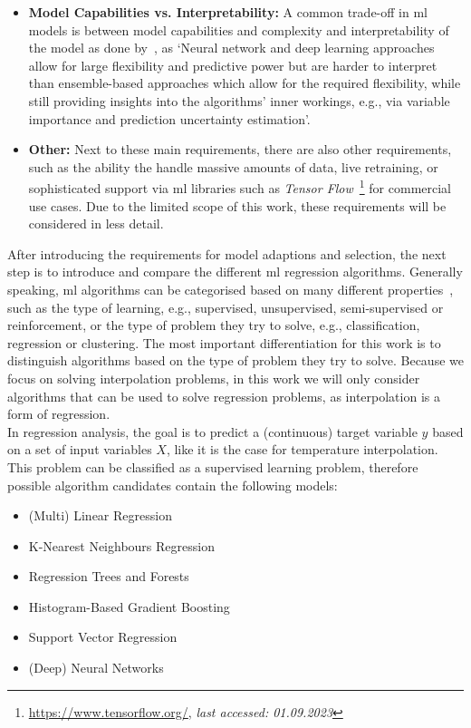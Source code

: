 \begin{itemize}
    \item \textbf{Model Capabilities vs. Interpretability:} A common trade-off in \gls{ml} models is between model capabilities and complexity and interpretability of the model as done by~\cite{zumwald2021mapping}, as `Neural network and deep learning approaches allow for large flexibility and predictive power but are harder to interpret than ensemble-based approaches which allow for the required flexibility, while still providing insights into the algorithms' inner workings, e.g., via variable importance and prediction uncertainty estimation'.
    \item \textbf{Other:} Next to these main requirements, there are also other requirements, such as the ability the handle massive amounts of data, live retraining, or sophisticated support via \gls{ml} libraries such as \textit{Tensor Flow}~\footnote{\url{https://www.tensorflow.org/}, \textit{last accessed: 01.09.2023}} for commercial use cases. Due to the limited scope of this work, these requirements will be considered in less detail.
\end{itemize}

After introducing the requirements for model adaptions and selection, the next step is to introduce and compare the different \gls{ml} regression algorithms.
Generally speaking, \gls{ml} algorithms can be categorised based on many different properties~\cite{sarker2021machine}, such as the type of learning, e.g., supervised, unsupervised, semi-supervised or reinforcement, or the type of problem they try to solve, e.g., classification, regression or clustering. The most important differentiation for this work is to distinguish algorithms based on the type of problem they try to solve. Because we focus on solving interpolation problems, in this work we will only consider algorithms that can be used to solve regression problems, as interpolation is a form of regression.\\
In regression analysis, the goal is to predict a (continuous) target variable $y$ based on a set of input variables $X$, like it is the case for temperature interpolation. This problem can be classified as a supervised learning problem, therefore possible algorithm candidates contain the following models:

\begin{itemize}
    \item (Multi) Linear Regression
    \item K-Nearest Neighbours Regression
    \item Regression Trees and Forests
    \item Histogram-Based Gradient Boosting
    \item Support Vector Regression
    \item (Deep) Neural Networks
\end{itemize}

